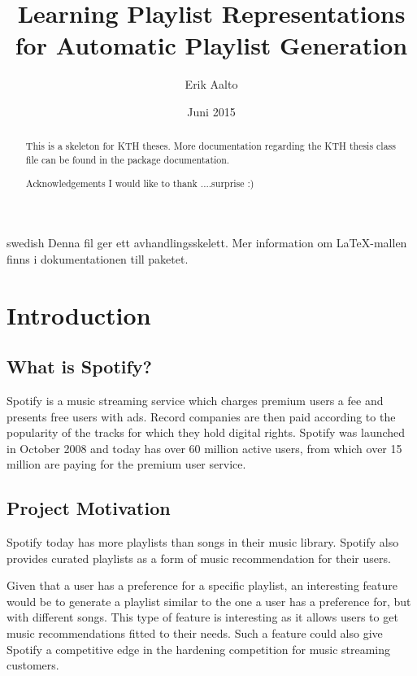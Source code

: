 \documentclass[a4paper,11pt]{kth-mag}
\title{Learning Playlist Representations for Automatic Playlist Generation}
\author{Erik Aalto}
\date{Juni 2015}
\begin{document}
\frontmatter
\pagestyle{empty}
\removepagenumbers
\maketitle
{}
\begin{abstract}
  This is a skeleton for KTH theses. More documentation
  regarding the KTH thesis class file can be found in
  the package documentation.


\end{abstract}
\clearpage
\begin{foreignabstract}{swedish}
  Denna fil ger ett avhandlingsskelett.
  Mer information om \LaTeX-mallen finns i
  dokumentationen till paketet.

\end{foreignabstract}
\clearpage
\begin{abstract}{Acknowledgements}
  I would like to thank ....surprise :)

\end{abstract}
\clearpage
\tableofcontents*
\mainmatter
\pagestyle{newchap}
\chapter{Introduction}

\section{What is Spotify?}
Spotify is a music streaming service which charges premium users a fee and presents free users with ads. Record companies are then paid according to the popularity of the tracks for which they hold digital rights. Spotify was launched in October 2008 and today has over 60 million active users, from which over 15 million are paying for the premium user service.

\section{Project Motivation}
Spotify today has more playlists than songs in their music library. Spotify also provides curated playlists as a form of music recommendation for their users. 

Given that a user has a preference for a specific playlist, an interesting feature would be to generate a playlist similar to the one a user has a preference for, but with different songs. This type of feature is interesting as it allows users to get music recommendations fitted to their needs. Such a feature could also give Spotify a competitive edge in the hardening competition for music streaming customers.
\end{document}
